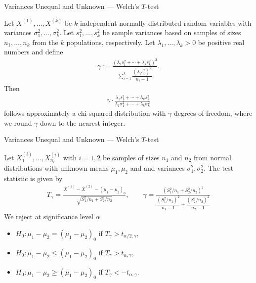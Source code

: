 \begin{frame}{Variances Unequal and Unknown --- Welch's $T$-test}

\justifying
{} Let $X^{(1)}, \ldots, X^{(k)}$ be $k$ independent normally distributed random variables with variances $\sigma_1^2, \ldots, \sigma_k^2$. Let $s_1^2, \ldots, s_k^2$ be sample variances based on samples of sizes $n_1, \ldots, n_k$ from the $k$ populations, respectively. Let $\lambda_1, \ldots, \lambda_k > 0$ be positive real numbers and define
\begin{align*}
\gamma := \frac{(\lambda_1 s_1^2 + \cdots + \lambda_k s_k^2)^2}{\displaystyle\sum_{i=1}^k \dfrac{(\lambda_i s_i^2)^2}{n_i-1} }.
\end{align*}
Then
\begin{align*}
\gamma \cdot \frac{\lambda_1 s_1^2 + \cdots + \lambda_k s_k^2}{\lambda_1 \sigma_1^2 + \cdots + \lambda_k \sigma_k^2}
\end{align*}
follows approximately a chi-squared distribution with $\gamma$ degrees of freedom, where we round $\gamma$ down to the nearest integer.


\end{frame}


\begin{frame}{Variances Unequal and Unknown --- Welch's $T$-test}

\justifying
{} Let $X_1^{(i)}, \ldots, X_{n_i}^{(i)}$ with $i = 1, 2$ be samples of sizes $n_1$ and $n_2$ from normal distributions with unknown means $\mu_1, \mu_2$ and  and  variances $\sigma_1^2, \sigma_2^2$. The test statistic is given by
\begin{align*}
T_{\gamma} = \frac{\overline{X}^{(1)} - \overline{X}^{(2)} - (\mu_1-\mu_2)_0}{\sqrt{S_1^2/n_1 + S_2^2/n_2}}, \qquad \gamma = \frac{(S_1^2/n_1 + S_2^2/n_2)^2}{\dfrac{(S_1^2/n_1)^2}{n_1-1} + \dfrac{(S_2^2/n_2)^2}{n_2-1}}
\end{align*}
We reject at significance level $\alpha$
\begin{itemize}
	\item $H_0: \mu_1-\mu_2 = (\mu_1-\mu_2)_0$ if $T_{\gamma} > t_{\alpha/2,\gamma}$,
	\item $H_0: \mu_1-\mu_2 \leq (\mu_1-\mu_2)_0$ if $T_{\gamma} > t_{\alpha,\gamma}$,
	\item $H_0: \mu_1-\mu_2 \geq (\mu_1-\mu_2)_0$ if $T_{\gamma} < -t_{\alpha,\gamma}$.
\end{itemize}



\end{frame}


